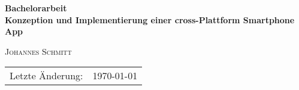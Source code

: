 
\begin{titlepage}



\begin{flushright}
\huge \bfseries {Bachelorarbeit}\\[1.4cm]
\huge \bfseries {Konzeption und Implementierung einer cross-Plattform Smartphone App}\\[0.4cm]
\end{flushright}

\begin{flushright}
	\textsc{Johannes Schmitt}\\
\end{flushright}


\vfill %

\renewcommand{\arraystretch}{1.5}
\begin{flushleft}
	\begin{tabular}[H]{ll}
    \large{Letzte \"Anderung:} & \large{\today} \\
	\end{tabular}
\end{flushleft}

\renewcommand{\arraystretch}{1}

\vspace{24pt}


\end{titlepage}
